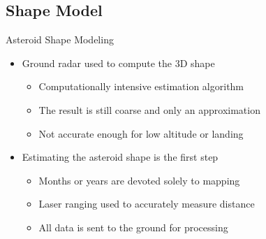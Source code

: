 \documentclass[11pt,professionalfonts]{beamer}
\begin{document}
\subsection[Shape Model]{Shape Model}
\begin{frame}{Asteroid Shape Modeling}
    \begin{itemize}
        \item<1-> Ground radar used to compute the 3D shape
        \begin{itemize}
            \item Computationally intensive estimation algorithm 
            \item The result is still coarse and only an approximation
            \item Not accurate enough for low altitude or landing
        \end{itemize}
    \item<2-> Estimating the asteroid shape is the first step
    \begin{itemize}
        \item Months or years are devoted solely to mapping
        \item Laser ranging used to accurately measure distance
        \item All data is sent to the ground for processing
    \end{itemize}
    \end{itemize}
    
\end{frame}
\end{document}
